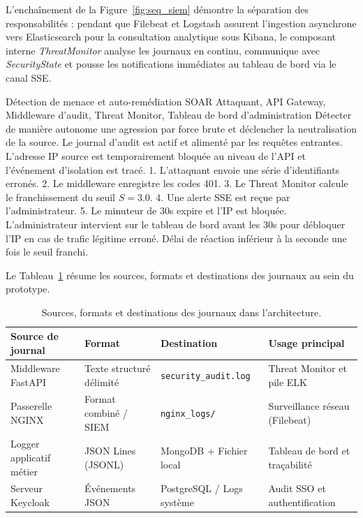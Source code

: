 L'enchaînement de la Figure~\ref{fig:seq_siem} démontre la séparation des responsabilités : pendant que Filebeat et Logstash assurent l'ingestion asynchrone vers Elasticsearch pour la consultation analytique sous Kibana, le composant interne \textit{ThreatMonitor} analyse les journaux en continu, communique avec \textit{SecurityState} et pousse les notifications immédiates au tableau de bord via le canal SSE.

\scenariotable
{Détection de menace et auto-remédiation SOAR}
{Attaquant, API Gateway, Middleware d'audit, Threat Monitor, Tableau de bord d'administration}
{Détecter de manière autonome une agression par force brute et déclencher la neutralisation de la source.}
{Le journal d'audit est actif et alimenté par les requêtes entrantes.}
{L'adresse IP source est temporairement bloquée au niveau de l'API et l'événement d'isolation est tracé.}
{1. L'attaquant envoie une série d'identifiants erronés. 2. Le middleware enregistre les codes 401. 3. Le Threat Monitor calcule le franchissement du seuil $S=3.0$. 4. Une alerte SSE est reçue par l'administrateur. 5. Le minuteur de 30s expire et l'IP est bloquée.}
{L'administrateur intervient sur le tableau de bord avant les 30s pour débloquer l'IP en cas de trafic légitime erroné.}
{Délai de réaction inférieur à la seconde une fois le seuil franchi.}

Le Tableau~\ref{tab:logging} résume les sources, formats et destinations des journaux au sein du prototype.

\begin{table}[!htbp]
\centering
\small
\begin{tabular}{@{}llll@{}}
\toprule
\textbf{Source de journal} & \textbf{Format} & \textbf{Destination} & \textbf{Usage principal} \\
\midrule
Middleware FastAPI         & Texte structuré délimité & \texttt{security\_audit.log} & Threat Monitor et pile ELK \\
Passerelle NGINX           & Format combiné / SIEM    & \texttt{nginx\_logs/}        & Surveillance réseau (Filebeat) \\
Logger applicatif métier   & JSON Lines (JSONL)       & MongoDB + Fichier local      & Tableau de bord et traçabilité \\
Serveur Keycloak           & Événements JSON          & PostgreSQL / Logs système    & Audit SSO et authentification \\
\bottomrule
\end{tabular}
\caption{Sources, formats et destinations des journaux dans l'architecture.}
\label{tab:logging}
\end{table}

